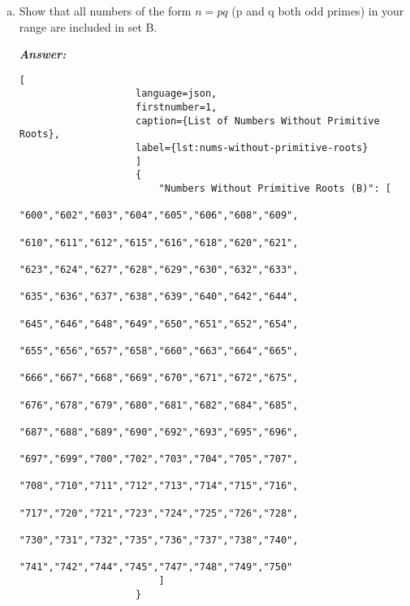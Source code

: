 \documentclass[11pt,a4paper,fleqn]{article}
\makeatletter
\newcommand{\tpmod}[1]{{\@displayfalse\pmod{#1}}}
\makeatother
\begin{document}
\begin{enumerate}[1.]
\begin{enumerate}[(a)]
\begin{flushleft}
				Also, 
				\begin{align}
					& a^m \equiv 1\tpmod{pq} \\
					& \Longleftrightarrow a^m \equiv 1\tpmod p, a^m \equiv 1\tpmod q (\text{By Chinese Remainder Theorem})\\ 
					& \Longleftrightarrow m \equiv 0\tpmod{p-1}, m \equiv 0\tpmod{q-1}\\
					&(\text{Because by Fermat\'s Little Theorem, $a^{p-1} \equiv 1 \tpmod{p}$ and $a^{q-1} \equiv 1\tpmod{q}$})\nonumber\\
					& \Longleftrightarrow (p-1)|m, (q-1)|m \\
					& \Longleftrightarrow lcm(p-1, q-1)|m
				\end{align}
				This means that $ord_p(a) = lcm(p-1, q-1) < (p-1)(q-1)$ as we have seen in \ref{item:Q3biii} and it's a contradiction from our initial assumption that  $n = p.q$ has primitive roots.
			\end{flushleft}
			
			\item Show that all numbers of the form $n = pq$ (p and q both odd primes) in your range are included in set B.
			\begin{flushleft}
				\textbf{\textit{Answer:}}
				\begin{lstlisting}[
					language=json,
					firstnumber=1,
					caption={List of Numbers Without Primitive Roots},
					label={lst:nums-without-primitive-roots}
					]
					{
						"Numbers Without Primitive Roots (B)": [
						"600","602","603","604","605","606","608","609",
						"610","611","612","615","616","618","620","621",
						"623","624","627","628","629","630","632","633",
						"635","636","637","638","639","640","642","644",
						"645","646","648","649","650","651","652","654",
						"655","656","657","658","660","663","664","665",
						"666","667","668","669","670","671","672","675",
						"676","678","679","680","681","682","684","685",
						"687","688","689","690","692","693","695","696",
						"697","699","700","702","703","704","705","707",
						"708","710","711","712","713","714","715","716",
						"717","720","721","723","724","725","726","728",
						"730","731","732","735","736","737","738","740",
						"741","742","744","745","747","748","749","750"
						]
					}
				\end{lstlisting}
				

\end{flushleft}
\end{enumerate}
\end{enumerate}
\end{document}
